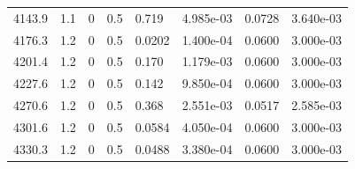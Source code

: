 \documentclass[preview]{standalone}
\begin{document}
{{{{\begin{tabular}{L{1.2cm}C{1.2cm} C{0.3cm}C{0.5cm} C{1.4cm}C{1.4cm} C{1.4cm}C{1.4cm}}
  4143.9  &   1.1  & 0     & 0.5 &  0.719  & 4.985e-03  & 0.0728 &  3.640e-03   \\ 
  4176.3  &   1.2  & 0     & 0.5 &  0.0202  & 1.400e-04  & 0.0600 &  3.000e-03   \\ 
  4201.4  &   1.2  & 0     & 0.5 &  0.170  & 1.179e-03  & 0.0600 &  3.000e-03   \\ 
  4227.6  &   1.2  & 0     & 0.5 &  0.142  & 9.850e-04  & 0.0600 &  3.000e-03   \\ 
  4270.6  &   1.2  & 0     & 0.5 &  0.368  & 2.551e-03  & 0.0517 &  2.585e-03   \\ 
  4301.6  &   1.2  & 0     & 0.5 &  0.0584  & 4.050e-04  & 0.0600 &  3.000e-03   \\ 
  4330.3  &   1.2  & 0     & 0.5 &  0.0488  & 3.380e-04  & 0.0600 &  3.000e-03   \\ 
\hline 
\end{tabular} 

}}}}
\end{document}
